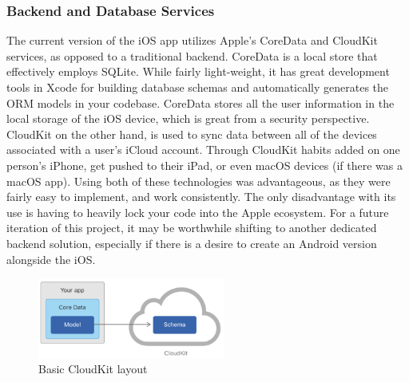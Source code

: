 \subsubsection{Backend and Database Services}
The current version of the iOS app utilizes Apple’s CoreData and CloudKit services, as opposed to a traditional backend. CoreData is a local store that effectively employs SQLite. While fairly light-weight, it has great development tools in Xcode for building database schemas and automatically generates the ORM models in your codebase. CoreData stores all the user information in the local storage of the iOS device, which is great from a security perspective. CloudKit on the other hand, is used to sync data between all of the devices associated with a user’s iCloud account. Through CloudKit habits added on one person’s iPhone, get pushed to their iPad, or even macOS devices (if there was a macOS app). Using both of these technologies was advantageous, as they were fairly easy to implement, and work consistently. The only disadvantage with its use is having to heavily lock your code into the Apple ecosystem. For a future iteration of this project, it may be worthwhile shifting to another dedicated backend solution, especially if there is a desire to create an Android version alongside the iOS.
\begin{figure}[h]
\centering
\includegraphics[width=0.55\textwidth]{images/cloudkit.png}
\caption{Basic CloudKit layout}
\end{figure}

